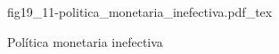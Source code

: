 \begin{figure}[h]
\centering
\def\svgwidth{0.5\textwidth}
{fig19_11-politica_monetaria_inefectiva.pdf_tex}
\caption{Política monetaria inefectiva}
\label{fig19_11-politica_monetaria_inefectiva}
\end{figure}